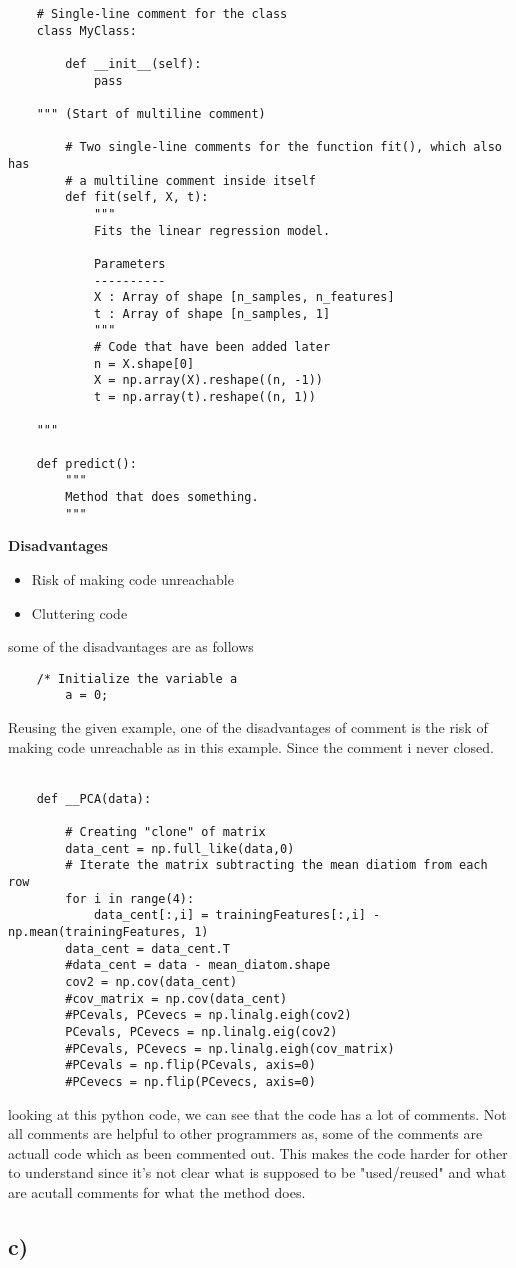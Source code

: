 \begin{verbatim}
    # Single-line comment for the class
    class MyClass:

        def __init__(self):
            pass
    
    """ (Start of multiline comment)

        # Two single-line comments for the function fit(), which also has
        # a multiline comment inside itself
        def fit(self, X, t):
            """
            Fits the linear regression model.

            Parameters
            ----------
            X : Array of shape [n_samples, n_features]
            t : Array of shape [n_samples, 1]
            """        
            # Code that have been added later
            n = X.shape[0]
            X = np.array(X).reshape((n, -1))
            t = np.array(t).reshape((n, 1))

    """

    def predict():
        """
        Method that does something.
        """
\end{verbatim}

\noindent
\textbf{Disadvantages}
\begin{itemize}
    \item Risk of making code unreachable
    \item Cluttering code 
\end{itemize}
some of the disadvantages are as follows

\begin{verbatim}
    /* Initialize the variable a
        a = 0;

    \end{verbatim}

Reusing the given example, one of the disadvantages of comment is the risk of making code unreachable
as in this example. Since the comment i never closed.
\\
\\
\begin{verbatim}
    def __PCA(data):
        
        # Creating "clone" of matrix
        data_cent = np.full_like(data,0) 
        # Iterate the matrix subtracting the mean diatiom from each row
        for i in range(4):
            data_cent[:,i] = trainingFeatures[:,i] - np.mean(trainingFeatures, 1)
        data_cent = data_cent.T
        #data_cent = data - mean_diatom.shape
        cov2 = np.cov(data_cent)
        #cov_matrix = np.cov(data_cent)
        #PCevals, PCevecs = np.linalg.eigh(cov2)
        PCevals, PCevecs = np.linalg.eig(cov2)
        #PCevals, PCevecs = np.linalg.eigh(cov_matrix)
        #PCevals = np.flip(PCevals, axis=0)
        #PCevecs = np.flip(PCevecs, axis=0)
\end{verbatim}
looking at this python code, we can see that the code has a lot of comments. Not all comments are helpful
to other programmers as, some of the comments are actuall code which as been commented out. This makes the
code harder for other to understand since it's not clear what is supposed to be "used/reused" and what are 
acutall comments for what the method does.


\subsection{c)}

